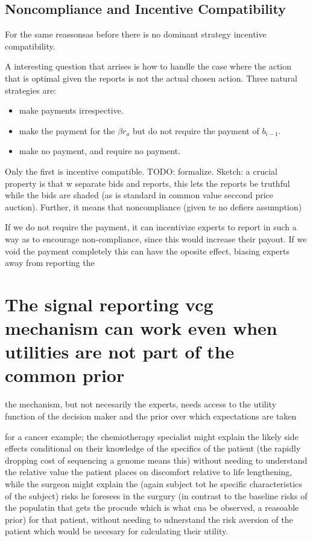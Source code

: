 \subsection{Noncompliance and Incentive Compatibility}

For the same reassonsas before there is no dominant strategy incentive compatibility. 

A interesting question that arrises is how to handle the case where the action that is optimal given the reports is not the actual chosen action. Three natural strategies are:

\begin{itemize}
\item make payments irrespective.
\item make the payment for the $\beta r_a$ but do not require the payment of $b_{i-1}$.
\item make no payment, and require no payment.
\end{itemize}

Only the first is incentive compatible. TODO: formalize. Sketch: a crucial property is that w separate bids and reports, this lets the reports be truthful while the bids are shaded (as is standard in common value seccond price auction). Further, it means that noncompliance (given te no defiers assumption) 

If we do not require the payment, it can incentivize experts to report in such a way as to encourage non-compliance, since this would increase their payout.
If we void the payment completely this can have the oposite effect, biasing experts away from reporting the 






\section{The signal reporting vcg mechanism can work even when utilities are not part of the common prior}

the mechanism, but not necesarily the experts, needs access to the utility function of the decision maker and the prior over which expectations are taken 

for a cancer example; the chemiotherapy specialist might explain the likely side effects conditional on their knowledge of the specifics of the patient (the rapidly dropping cost of sequencing a genome means this) without needing to understand the relative value the patient places on discomfort relative to life lengthening, while the surgeon might explain the (again subject tot he specific characteristics of the subject) risks he foresees in the surgury (in contrast to the baseline risks of the populatin that gets the procude which is what cna be observed, a reasoable prior) for that patient, without needing to udnerstand the risk aversion of the patient which would be necesary for calculating their utility.

